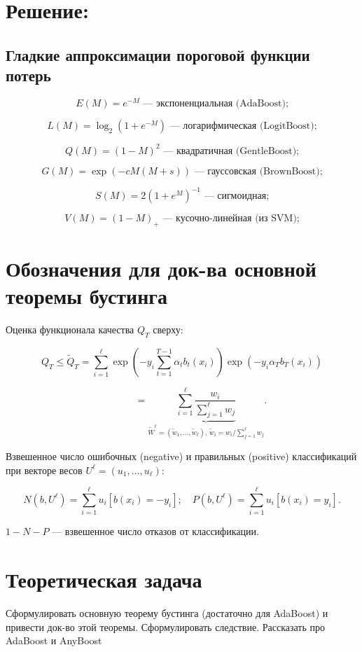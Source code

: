 \section*{Решение:}
\subsection*{Гладкие аппроксимации пороговой функции потерь}
\[
E(M) = e^{-M} \text{ — экспоненциальная (AdaBoost);}
\]

\[
L(M) = \log_2(1 + e^{-M}) \text{ — логарифмическая (LogitBoost);}
\]

\[
Q(M) = (1 - M)^2 \text{ — квадратичная (GentleBoost);}
\]

\[
G(M) = \exp\left(-cM(M + s)\right) \text{ — гауссовская (BrownBoost);}
\]

\[
S(M) = 2(1 + e^{M})^{-1} \text{ — сигмоидная;}
\]

\[
V(M) = (1 - M)_+ \text{ — кусочно-линейная (из SVM);}
\]

\section*{Обозначения для док-ва основной теоремы бустинга}

Оценка функционала качества \(Q_T\) сверху:

\[
Q_T \leq \widetilde{Q}_T = \sum_{i=1}^\ell \exp\left(-y_i \sum_{t=1}^{T-1} \alpha_t b_t(x_i)\right) \exp\left(-y_i \alpha_T b_T(x_i)\right)
\]

\[
\phantom{Q_T \leq \widetilde{Q}_T} = \underbrace{\sum_{i=1}^\ell \frac{w_i}{\sum_{j=1}^\ell w_j}}_{\widetilde{W}^\ell = (\widetilde{w}_1, \ldots, \widetilde{w}_\ell), \, \widetilde{w}_i = w_i / \sum_{j=1}^\ell w_j}.
\]

Взвешенное число ошибочных (negative) и правильных (positive) классификаций при векторе весов \(U^\ell = (u_1, \ldots, u_\ell)\):

\[
N(b, U^\ell) = \sum_{i=1}^\ell u_i [b(x_i) = -y_i]; \quad P(b, U^\ell) = \sum_{i=1}^\ell u_i [b(x_i) = y_i].
\]

\(1 - N - P\) — взвешенное число отказов от классификации.

\section*{Теоретическая задача}
Сформулировать основную теорему бустинга (достаточно для AdaBoost) и привести док-во этой теоремы. Сформулировать следствие. Рассказать про AdaBoost и AnyBoost

